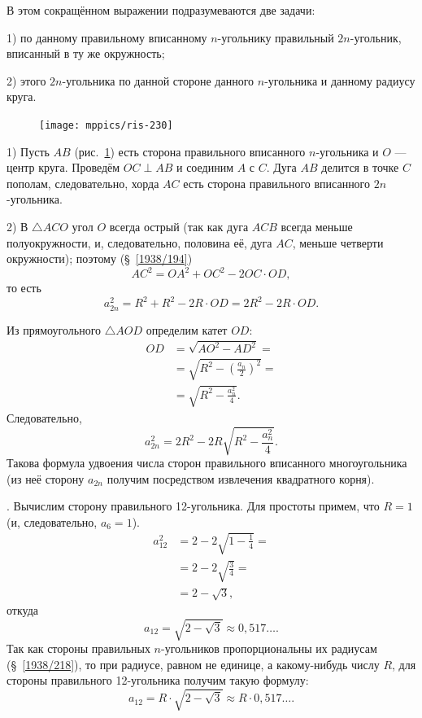 \documentclass[oneside]{book}
\begin{document}
В этом сокращённом выражении подразумеваются две задачи:

1) по данному правильному вписанному $n$-угольнику  правильный $2n$-угольник, вписанный в ту же окружность;

2)  этого $2n$-угольника по данной стороне данного $n$-угольника и данному радиусу круга.

\begin{figure}
\centering
\texttt{[image: mppics/ris-230]}
\caption{}\label{1938/ris-230}
\end{figure}

1) Пусть $AB$ (рис.~\ref{1938/ris-230}) есть сторона правильного вписанного $n$-угольника и $O$ — центр круга.
Проведём $OC\perp AB$ и соединим $A$ с $C$.
Дуга $AB$ делится в точке $C$ пополам, следовательно, хорда $AC$ есть сторона правильного вписанного $2n$-угольника.

2) В $\triangle ACO$ угол $O$ всегда острый (так как дуга $ACB$ всегда меньше полуокружности, и, следовательно, половина её, дуга $AC$, меньше четверти окружности);
поэтому (§~\ref{1938/194})
\[AC^2=OA^2+OC^2-2OC\cdot OD,\]
то есть
\[a_{2n}^2=R^2+R^2-2R\cdot OD=2R^2-2R\cdot OD.\]

Из прямоугольного $\triangle AOD$ определим катет $OD$:
\begin{align*}
OD&=\sqrt{AO^2-AD^2}=
\\
&=\sqrt{R^2-(\tfrac{a_n}2)^2}=
\\
&=\sqrt{R^2-\tfrac{a_n^2}4}.
\end{align*}
Следовательно,
\[a_{2n}^2=2R^2-2R\sqrt{R^2-\frac{a_n^2}4}.\]
Такова формула удвоения числа сторон правильного вписанного многоугольника (из неё сторону $a_{2n}$ получим посредством извлечения квадратного корня).

\smallskip
{}.
Вычислим сторону правильного 12-угольника.
Для простоты примем, что $R=1$ (и, следовательно, $a_6 = 1$).
\begin{align*}
a_{12}^2&=2-2\sqrt{1-\tfrac14}=
\\
&=2-2\sqrt{\tfrac34}=
\\
&=2-\sqrt{3},
\end{align*}
откуда
\[a_{12}=\sqrt{2-\sqrt3}\approx 0{,}517\dots.\]
Так как стороны правильных $n$-угольников пропорциональны их радиусам (§~\ref{1938/218}), то при радиусе, равном не единице, а какому-нибудь числу $R$, для стороны правильного 12-угольника получим такую формулу:
\[a_{12}=R\cdot \sqrt{2-\sqrt3}\approx R\cdot 0{,}517\dots.\]
\end{document}
